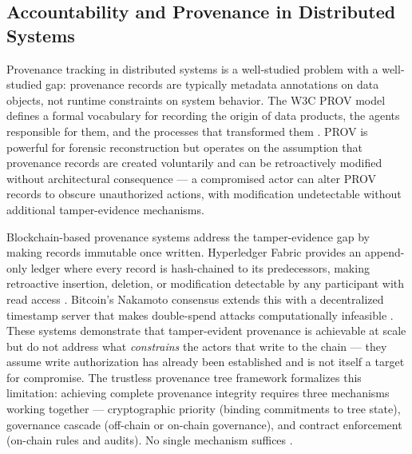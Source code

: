 \subsection{Accountability and Provenance in Distributed Systems}

Provenance tracking in distributed systems is a well-studied problem with a well-studied gap: provenance records are typically metadata annotations on data objects, not runtime constraints on system behavior. The W3C PROV model defines a formal vocabulary for recording the origin of data products, the agents responsible for them, and the processes that transformed them \cite{moreau2015-prov}. PROV is powerful for forensic reconstruction but operates on the assumption that provenance records are created voluntarily and can be retroactively modified without architectural consequence --- a compromised actor can alter PROV records to obscure unauthorized actions, with modification undetectable without additional tamper-evidence mechanisms.

Blockchain-based provenance systems address the tamper-evidence gap by making records immutable once written. Hyperledger Fabric provides an append-only ledger where every record is hash-chained to its predecessors, making retroactive insertion, deletion, or modification detectable by any participant with read access \cite{hyperledger2015}. Bitcoin's Nakamoto consensus extends this with a decentralized timestamp server that makes double-spend attacks computationally infeasible \cite{nakamoto2008bitcoin}. These systems demonstrate that tamper-evident provenance is achievable at scale but do not address what \emph{constrains} the actors that write to the chain --- they assume write authorization has already been established and is not itself a target for compromise. The trustless provenance tree framework formalizes this limitation: achieving complete provenance integrity requires three mechanisms working together --- cryptographic priority (binding commitments to tree state), governance cascade (off-chain or on-chain governance), and contract enforcement (on-chain rules and audits). No single mechanism suffices \cite{trustless2026}.

